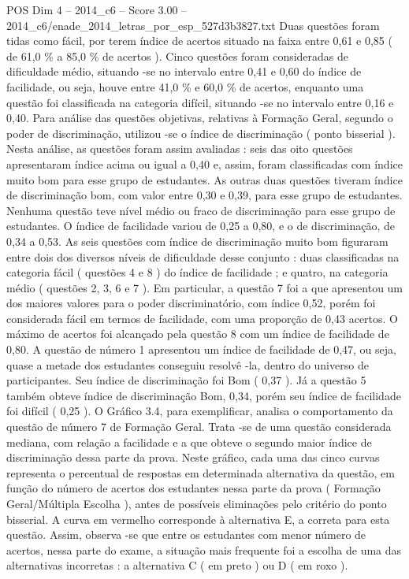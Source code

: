 \begin{textsample}{POS Dim 4 – 2014\_c6 – Score 3.00 – 2014\_c6/enade\_2014\_letras\_por\_esp\_527d3b3827.txt}
Duas questões foram tidas como fácil, por terem índice de acertos situado na faixa entre 0,61 e 0,85 ( de 61,0 \% a 85,0 \% de acertos ).
Cinco questões foram consideradas de dificuldade médio, situando -se no intervalo entre 0,41 e 0,60 do índice de facilidade, ou seja, houve entre 41,0 \% e 60,0 \% de acertos, enquanto uma questão foi classificada na categoria difícil, situando -se no intervalo entre 0,16 e 0,40.
Para análise das questões objetivas, relativas à Formação Geral, segundo o poder de discriminação, utilizou -se o índice de discriminação ( ponto bisserial ).
Nesta análise, as questões foram assim avaliadas : seis das oito questões apresentaram índice acima ou igual a 0,40 e, assim, foram classificadas com índice muito bom para esse grupo de estudantes.
As outras duas questões tiveram índice de discriminação bom, com valor entre 0,30 e 0,39, para esse grupo de estudantes.
Nenhuma questão teve nível médio ou fraco de discriminação para esse grupo de estudantes.
O índice de facilidade variou de 0,25 a 0,80, e o de discriminação, de 0,34 a 0,53.
As seis questões com índice de discriminação muito bom figuraram entre dois dos diversos níveis de dificuldade desse conjunto : duas classificadas na categoria fácil ( questões 4 e 8 ) do índice de facilidade ; e quatro, na categoria médio ( questões 2, 3, 6 e 7 ).
Em particular, a questão 7 foi a que apresentou um dos maiores valores para o poder discriminatório, com índice 0,52, porém foi considerada fácil em termos de facilidade, com uma proporção de 0,43 acertos.
O máximo de acertos foi alcançado pela questão 8 com um índice de facilidade de 0,80.
A questão de número 1 apresentou um índice de facilidade de 0,47, ou seja, quase a metade dos estudantes conseguiu resolvê -la, dentro do universo de participantes.
Seu índice de discriminação foi Bom ( 0,37 ).
Já a questão 5 também obteve índice de discriminação Bom, 0,34, porém seu índice de facilidade foi difícil ( 0,25 ).
O Gráfico 3.4, para exemplificar, analisa o comportamento da questão de número 7 de Formação Geral.
Trata -se de uma questão considerada mediana, com relação a facilidade e a que obteve o segundo maior índice de discriminação dessa parte da prova.
Neste gráfico, cada uma das cinco curvas representa o percentual de respostas em determinada alternativa da questão, em função do número de acertos dos estudantes nessa parte da prova ( Formação Geral/Múltipla Escolha ), antes de possíveis eliminações pelo critério do ponto bisserial.
A curva em vermelho corresponde à alternativa E, a correta para esta questão.
Assim, observa -se que entre os estudantes com menor número de acertos, nessa parte do exame, a situação mais frequente foi a escolha de uma das alternativas incorretas : a alternativa C ( em preto ) ou D ( em roxo ).

\end{textsample}
